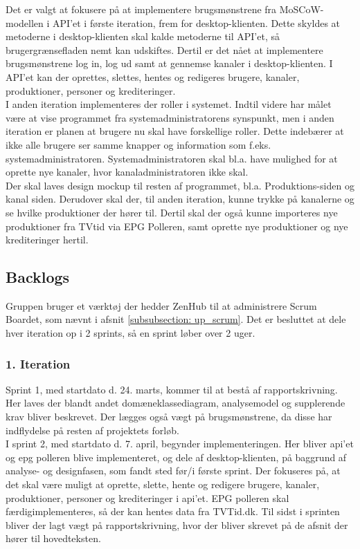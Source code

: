 Det er valgt at fokusere på at implementere brugsmønstrene fra MoSCoW-modellen i API'et i første iteration, frem for desktop-klienten. Dette skyldes at metoderne i desktop-klienten skal kalde metoderne til API'et, så brugergrænsefladen nemt kan udskiftes. Dertil er det nået at implementere brugsmønstrene log in, log ud samt at gennemse kanaler i desktop-klienten. I API'et kan der oprettes, slettes, hentes og redigeres brugere, kanaler, produktioner, personer og krediteringer. \\

I anden iteration implementeres der roller i systemet. Indtil videre har målet være at vise programmet fra systemadministratorens synspunkt, men i anden iteration er planen at brugere nu skal have forskellige roller. Dette indebærer at ikke alle brugere ser samme knapper og information som f.eks. systemadministratoren. Systemadministratoren skal bl.a. have mulighed for at oprette nye kanaler, hvor kanaladministratoren ikke skal.\\

Der skal laves design mockup til resten af programmet, bl.a. Produktions-siden og kanal siden. Derudover skal der, til anden iteration, kunne trykke på kanalerne og se hvilke produktioner der hører til. Dertil skal der også kunne importeres nye produktioner fra TVtid via EPG Polleren, samt oprette nye produktioner og nye krediteringer hertil.\\

\subsection{Backlogs}
Gruppen bruger et værktøj der hedder ZenHub til at administrere Scrum Boardet, som nævnt i afsnit \ref{subsubsection: up_scrum}. Det er besluttet at dele hver iteration op i 2 sprints, så en sprint løber over 2 uger.

\subsubsection{1. Iteration}
Sprint 1, med startdato d. 24. marts, kommer til at bestå af rapportskrivning. Her laves der blandt andet domæneklassediagram, analysemodel og supplerende krav bliver beskrevet. Der lægges også vægt på brugsmønstrene, da disse har indflydelse på resten af projektets forløb.\\

I sprint 2, med startdato d. 7. april, begynder implementeringen. Her bliver api'et og epg polleren blive implementeret, og dele af desktop-klienten, på baggrund af analyse- og designfasen, som fandt sted før/i første sprint. Der fokuseres på, at det skal være muligt at oprette, slette, hente og redigere brugere, kanaler, produktioner, personer og krediteringer i api'et. EPG polleren skal færdigimplementeres, så der kan hentes data fra TVTid.dk. Til sidst i sprinten bliver der lagt vægt på rapportskrivning, hvor der bliver skrevet på de afsnit der hører til hovedteksten.

